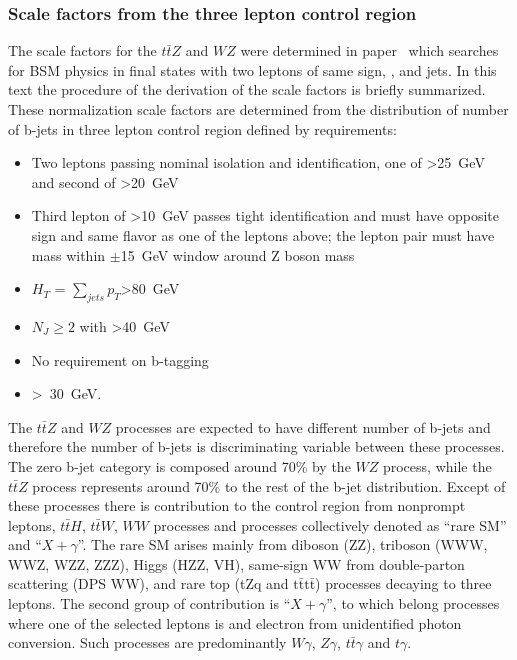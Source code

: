 
\subsubsection{Scale factors from the three lepton control region}

The scale factors for the $t\bar{t}Z$ and  $WZ$ were determined in paper~\cite{Sirunyan:2017uyt} which searches for BSM physics in final states with two leptons of same sign, \MET, and jets. In this text the procedure of the derivation of the scale factors is briefly summarized. These normalization scale factors are determined from the distribution of number of b-jets in three lepton control region defined by requirements:

\begin{itemize}
\item Two leptons passing nominal isolation and identification, one of \pt>25~GeV and second of \pt>20~GeV
\item Third lepton of \pt>10~GeV passes tight identification and must have opposite sign and same flavor as one of the leptons above; the lepton pair must have mass within $\pm$15~GeV window around Z boson mass
\item $H_{T}$ = $\sum_{jets} p_{T}$>80~GeV
\item $N_{J} \geq 2$ with \pt>40~GeV
\item No requirement on b-tagging
\item \MET>~30~GeV.
\end{itemize}

The $t\bar{t}Z$ and  $WZ$ processes are expected to have different number of b-jets and therefore the number of b-jets is discriminating variable between these processes. The zero b-jet category is composed around 70\% by the $WZ$ process, while the $t\bar{t}Z$ process represents around 70\% to the rest of the b-jet distribution. Except of these processes there is contribution to the control region from nonprompt leptons, $t\bar{t}H$,  $t\bar{t}W$, $WW$ processes and processes collectively denoted as ``rare SM'' and ``$X+\gamma$''. The rare SM arises mainly from diboson (ZZ), triboson (WWW, WWZ, WZZ, ZZZ), Higgs (HZZ, VH), same-sign WW from double-parton scattering (DPS WW), and rare top (tZq and $\mathrm{t\bar{t}t\bar{t}}$) processes decaying to three leptons. The second group of contribution is ``$X+\gamma$'', to which belong processes where one of the selected leptons is and electron from unidentified photon conversion. Such processes are predominantly $W\gamma$, $Z\gamma$, $t\bar{t}\gamma$ and $t\gamma$.

